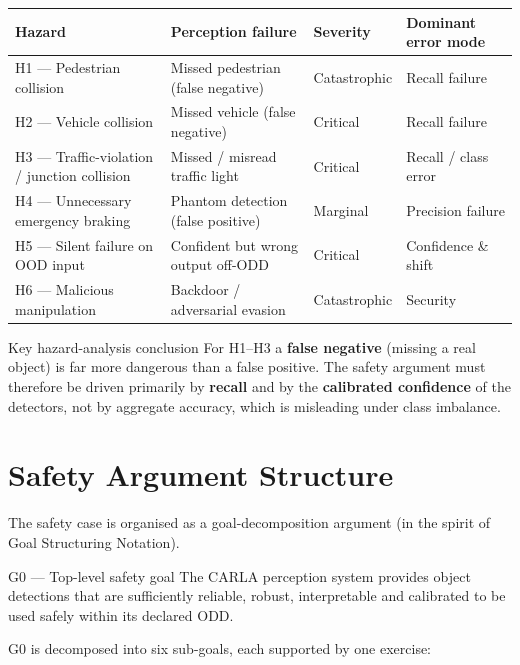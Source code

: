 \documentclass[11pt,a4paper]{article}
\begin{document}
\begin{longtable}{p{2.6cm} p{4.6cm} p{2.2cm} p{3.4cm}}
\toprule
\textbf{Hazard} & \textbf{Perception failure} & \textbf{Severity} & \textbf{Dominant error mode} \\
\midrule
\endhead
H1 --- Pedestrian collision & Missed pedestrian (false negative) & Catastrophic & Recall failure \\
H2 --- Vehicle collision & Missed vehicle (false negative) & Critical & Recall failure \\
H3 --- Traffic-violation / junction collision & Missed / misread traffic light & Critical & Recall / class error \\
H4 --- Unnecessary emergency braking & Phantom detection (false positive) & Marginal & Precision failure \\
H5 --- Silent failure on OOD input & Confident but wrong output off-ODD & Critical & Confidence \& shift \\
H6 --- Malicious manipulation & Backdoor / adversarial evasion & Catastrophic & Security \\
\bottomrule
\end{longtable}

\begin{claimbox}{Key hazard-analysis conclusion}
For H1--H3 a \textbf{false negative} (missing a real object) is far more
dangerous than a false positive. The safety argument must therefore be driven
primarily by \textbf{recall} and by the \textbf{calibrated confidence} of the
detectors, not by aggregate accuracy, which is misleading under class imbalance.
\end{claimbox}

\section{Safety Argument Structure}
The safety case is organised as a goal-decomposition argument (in the spirit of
Goal Structuring Notation).

\begin{claimbox}{G0 --- Top-level safety goal}
The CARLA perception system provides object detections that are sufficiently
reliable, robust, interpretable and calibrated to be used safely within its
declared ODD.
\end{claimbox}

\noindent G0 is decomposed into six sub-goals, each supported by one exercise:
\end{document}
